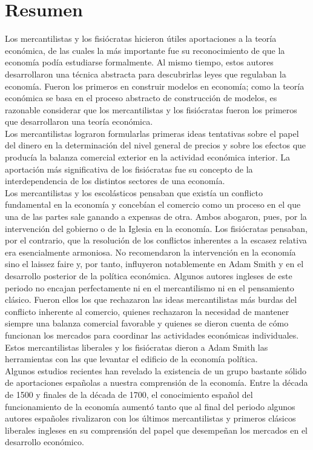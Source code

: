 \documentclass[10pt]{book}
\begin{document}
\section{Resumen}
Los mercantilistas y los fisiócratas hicieron útiles aportaciones a la teoría económica, de las cuales la más importante fue su reconocimiento de que la economía podía estudiarse formalmente. Al mismo tiempo, estos autores desarrollaron una técnica abstracta para descubrirlas leyes que regulaban la economía. Fueron los primeros en construir modelos en economía; como la teoría económica se basa en el proceso abstracto de construcción de modelos, es razonable considerar que los mercantilistas y los fisiócratas fueron los primeros que desarrollaron una teoría económica.\\
Los mercantilistas lograron formularlas primeras ideas tentativas sobre el papel del dinero en la determinación del nivel general de precios y sobre los efectos que producía la balanza comercial exterior en la actividad económica interior. La aportación más significativa de los fisiócratas fue su concepto de la interdependencia de los distintos sectores de una economía.\\
Los mercantilistas y los escolásticos pensaban que existía un conflicto fundamental en la economía y concebían el comercio como un proceso en el que una de las partes sale ganando a expensas de otra. Ambos abogaron, pues, por la intervención del gobierno o de la Iglesia en la economía. Los fisiócratas pensaban, por el contrario, que la resolución de los conflictos inherentes a la escasez relativa era esencialmente armoniosa. No recomendaron la intervención en la economía sino el laissez faire y, por tanto, influyeron notablemente en Adam Smith y en el desarrollo posterior de la política económica. Algunos autores ingleses de este periodo no encajan perfectamente ni en el mercantilismo ni en el pensamiento clásico. Fueron ellos los que rechazaron las ideas mercantilistas más burdas del conflicto inherente al comercio, quienes rechazaron la necesidad de mantener siempre una balanza comercial favorable y quienes se dieron cuenta de cómo funcionan los mercados para coordinar las actividades económicas individuales. Estos mercantilistas liberales y los fisiócratas dieron a Adam Smith las herramientas con las que levantar el edificio de la economía política.\\
Algunos estudios recientes han revelado la existencia de un grupo bastante sólido de aportaciones españolas a nuestra comprensión de la economía. Entre la década de 1500 y finales de la década de 1700, el conocimiento español del funcionamiento de la economía aumentó tanto que al final del periodo algunos autores españoles rivalizaron con los últimos mercantilistas y primeros clásicos liberales ingleses en su comprensión del papel que desempeñan los mercados en el desarrollo económico.\\ 
\end{document}

